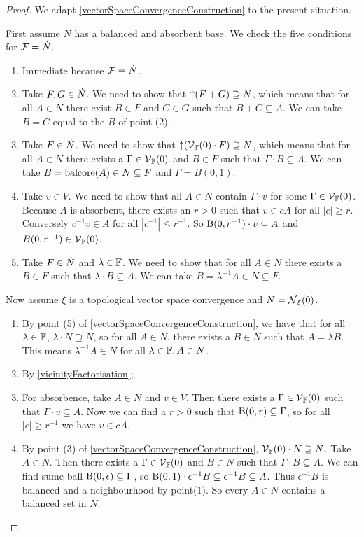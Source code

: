 \begin{proof}
We adapt \ref{vectorSpaceConvergenceConstruction} to the present situation.

First assume $N$ has a balanced and absorbent base. We check the five conditions for $\mathcal{F} = \dot{N}$.

\begin{enumerate}
\item Immediate because $\mathcal{F} = \dot{N}$.
\item Take $F,G\in \dot{N}$. We need to show that $\operatorname{\uparrow} (F + G) \supseteq N$, which means that for all $A \in N$ there exist $B\in F$ and $C\in G$ such that $B+C\subseteq A$. We can take $B = C$ equal to the $B$ of point (2).
\item Take $F\in \dot{N}$. We need to show that $\operatorname{\uparrow}(\operatorname{\mathcal{V}}_{\mathbb{F}}(0)\cdot F) \supseteq N$, which means that for all $A\in N$ there exists a $\Gamma\in \operatorname{\mathcal{V}}_{\mathbb{F}}(0)$ and $B\in F$ such that $\Gamma \cdot B\subseteq A$. We can take $B = \operatorname{balcore}(A) \in N \subseteq F$ and $\Gamma = B(0,1)$.
\item Take $v\in V$. We need to show that all $A\in N$ contain $\Gamma\cdot v$ for some $\Gamma \in \operatorname{\mathcal{V}}_{\mathbb{F}}(0)$. Because $A$ is absorbent, there exists an $r>0$ such that $v\in cA$ for all $|c|\geq r$. Conversely $c^{-1}v \in A$ for all $|c^{-1}| \leq r^{-1}$. So $\operatorname{B}(0,r^{-1})\cdot v \subseteq A$ and $B(0,r^{-1}) \in \operatorname{\mathcal{V}}_{\mathbb{F}}(0)$.
\item Take $F\in \dot{N}$ and $\lambda\in \mathbb{F}$. We need to show that for all $A\in N$ there exists a $B\in F$ such that $\lambda\cdot B\subseteq A$. We can take $B = \lambda^{-1}A \in N\subseteq F$.
\end{enumerate}

Now assume $\xi$ is a topological vector space convergence and $N = \operatorname{\mathcal{N}}_\xi(0)$.
\begin{enumerate}
\item By point (5) of \ref{vectorSpaceConvergenceConstruction}, we have that for all $\lambda\in \mathbb{F}$, $\lambda\cdot N \supseteq N$, so for all $A\in N$, there exists a $B\in N$ such that $A = \lambda B$. This means $\lambda^{-1}A \in N$ for all $\lambda\in \mathbb{F}, A\in N$.
\item By \ref{vicinityFactorisation};
\item For absorbence, take $A\in N$ and $v\in V$. Then there exists a $\Gamma \in \operatorname{\mathcal{V}}_{\mathbb{F}}(0)$ such that $\Gamma\cdot v \subseteq A$. Now we can find a $r>0$ such that $\operatorname{B}(0,r)\subseteq \Gamma$, so for all $|c|\geq r^{-1}$ we have $v\in cA$.
\item By point (3) of \ref{vectorSpaceConvergenceConstruction}, $\operatorname{\mathcal{V}}_{\mathbb{F}}(0)\cdot N \supseteq N$. Take $A\in N$. Then there exists a $\Gamma\in\operatorname{\mathcal{V}}_{\mathbb{F}}(0)$ and $B\in N$ such that $\Gamma\cdot B \subseteq A$. We can find sume ball $\operatorname{B}(0,\epsilon) \subseteq \Gamma$, so $\operatorname{B}(0,1)\cdot \epsilon^{-1}B\subseteq \epsilon^{-1}B \subseteq A$. Thus $\epsilon^{-1}B$ is balanced and a neighbourhood by point(1). So every $A\in N$ contains a balanced set in $N$.
\end{enumerate}
\end{proof}


